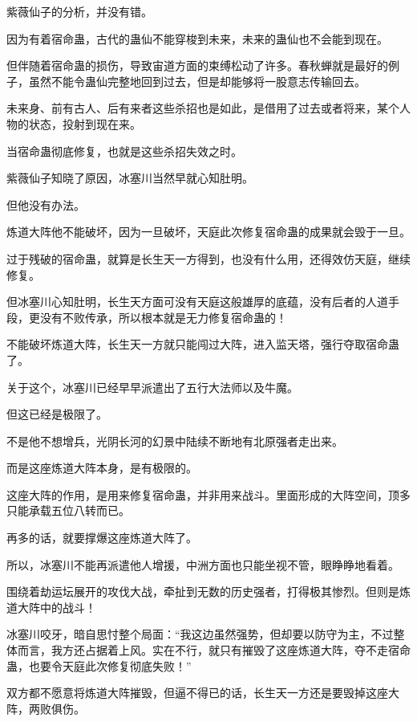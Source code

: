 
\begin{this_body}



紫薇仙子的分析，并没有错。

因为有着宿命蛊，古代的蛊仙不能穿梭到未来，未来的蛊仙也不会能到现在。

但伴随着宿命蛊的损伤，导致宙道方面的束缚松动了许多。春秋蝉就是最好的例子，虽然不能令蛊仙完整地回到过去，但是却能够将一股意志传输回去。

未来身、前有古人、后有来者这些杀招也是如此，是借用了过去或者将来，某个人物的状态，投射到现在来。

当宿命蛊彻底修复，也就是这些杀招失效之时。

紫薇仙子知晓了原因，冰塞川当然早就心知肚明。

但他没有办法。

炼道大阵他不能破坏，因为一旦破坏，天庭此次修复宿命蛊的成果就会毁于一旦。

过于残破的宿命蛊，就算是长生天一方得到，也没有什么用，还得效仿天庭，继续修复。

但冰塞川心知肚明，长生天方面可没有天庭这般雄厚的底蕴，没有后者的人道手段，更没有不败传承，所以根本就是无力修复宿命蛊的！

不能破坏炼道大阵，长生天一方就只能闯过大阵，进入监天塔，强行夺取宿命蛊了。

关于这个，冰塞川已经早早派遣出了五行大法师以及牛魔。

但这已经是极限了。

不是他不想增兵，光阴长河的幻景中陆续不断地有北原强者走出来。

而是这座炼道大阵本身，是有极限的。

这座大阵的作用，是用来修复宿命蛊，并非用来战斗。里面形成的大阵空间，顶多只能承载五位八转而已。

再多的话，就要撑爆这座炼道大阵了。

所以，冰塞川不能再派遣他人增援，中洲方面也只能坐视不管，眼睁睁地看着。

围绕着劫运坛展开的攻伐大战，牵扯到无数的历史强者，打得极其惨烈。但则是炼道大阵中的战斗！

冰塞川咬牙，暗自思忖整个局面：“我这边虽然强势，但却要以防守为主，不过整体而言，我方还占据着上风。实在不行，就只有摧毁了这座炼道大阵，夺不走宿命蛊，也要令天庭此次修复彻底失败！”

双方都不愿意将炼道大阵摧毁，但逼不得已的话，长生天一方还是要毁掉这座大阵，两败俱伤。


\end{this_body}
